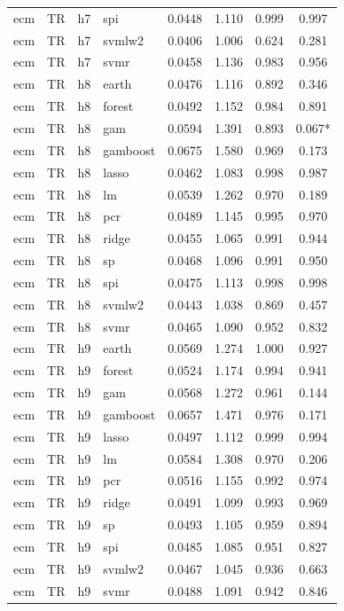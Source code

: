 \begin{ThreePartTable}
\begin{longtable}[t]{llclcccc}
ecm & TR & h7 & spi & 0.0448 & 1.110 & 0.999 & 0.997\\
ecm & TR & h7 & svmlw2 & 0.0406 & 1.006 & 0.624 & 0.281\\
ecm & TR & h7 & svmr & 0.0458 & 1.136 & 0.983 & 0.956\\
\addlinespace
ecm & TR & h8 & earth & 0.0476 & 1.116 & 0.892 & 0.346\\
ecm & TR & h8 & forest & 0.0492 & 1.152 & 0.984 & 0.891\\
ecm & TR & h8 & gam & 0.0594 & 1.391 & 0.893 & 0.067*\\
ecm & TR & h8 & gamboost & 0.0675 & 1.580 & 0.969 & 0.173\\
ecm & TR & h8 & lasso & 0.0462 & 1.083 & 0.998 & 0.987\\
ecm & TR & h8 & lm & 0.0539 & 1.262 & 0.970 & 0.189\\
ecm & TR & h8 & pcr & 0.0489 & 1.145 & 0.995 & 0.970\\
ecm & TR & h8 & ridge & 0.0455 & 1.065 & 0.991 & 0.944\\
ecm & TR & h8 & sp & 0.0468 & 1.096 & 0.991 & 0.950\\
ecm & TR & h8 & spi & 0.0475 & 1.113 & 0.998 & 0.998\\
ecm & TR & h8 & svmlw2 & 0.0443 & 1.038 & 0.869 & 0.457\\
ecm & TR & h8 & svmr & 0.0465 & 1.090 & 0.952 & 0.832\\
\addlinespace
ecm & TR & h9 & earth & 0.0569 & 1.274 & 1.000 & 0.927\\
ecm & TR & h9 & forest & 0.0524 & 1.174 & 0.994 & 0.941\\
ecm & TR & h9 & gam & 0.0568 & 1.272 & 0.961 & 0.144\\
ecm & TR & h9 & gamboost & 0.0657 & 1.471 & 0.976 & 0.171\\
ecm & TR & h9 & lasso & 0.0497 & 1.112 & 0.999 & 0.994\\
ecm & TR & h9 & lm & 0.0584 & 1.308 & 0.970 & 0.206\\
ecm & TR & h9 & pcr & 0.0516 & 1.155 & 0.992 & 0.974\\
ecm & TR & h9 & ridge & 0.0491 & 1.099 & 0.993 & 0.969\\
ecm & TR & h9 & sp & 0.0493 & 1.105 & 0.959 & 0.894\\
ecm & TR & h9 & spi & 0.0485 & 1.085 & 0.951 & 0.827\\
ecm & TR & h9 & svmlw2 & 0.0467 & 1.045 & 0.936 & 0.663\\
ecm & TR & h9 & svmr & 0.0488 & 1.091 & 0.942 & 0.846\\

\end{longtable}
\end{ThreePartTable}
